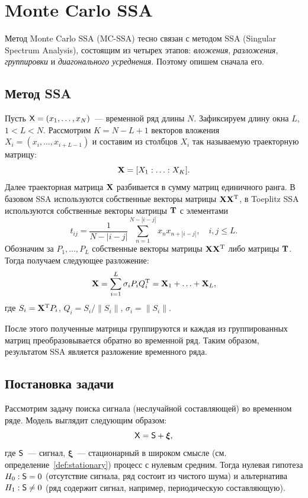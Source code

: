 \documentclass[specialist,
substylefile = spbu_report.rtx,
subf,12pt]{disser}
\theoremstyle{definition}
\begin{document}
\section{Monte Carlo SSA}\label{sect:mcssa}

Метод Monte Carlo SSA (MC-SSA) тесно связан с методом SSA (Singular Spectrum Analysis), состоящим из четырех этапов: \emph{вложения}, \emph{разложения}, \emph{группировки} и \emph{диагонального усреднения}. Поэтому опишем сначала его.
\subsection{Метод SSA}
Пусть $\mathsf{X}=(x_1,\ldots,x_N)$~--- временной ряд длины $N$. Зафиксируем длину окна $L$, $1<L<N$. Рассмотрим $K=N-L+1$ векторов вложения $X_i=(x_i,\ldots,x_{i+L-1})$ и составим из столбцов $X_i$ так называемую траекторную матрицу:
\[
	\mathbf{X} = [X_1:\ldots:X_K].
\]
Далее траекторная матрица $\mathbf{X}$ разбивается в сумму матриц единичного ранга. В базовом SSA используются собственные векторы матрицы $\mathbf{X}\mathbf{X}^{\mathrm{T}}$, в Toeplitz SSA используются собственные векторы матрицы $\mathbf{T}$ с элементами
\begin{equation}\label{eq:toeplitz}
	t_{ij} = \frac{1}{N - |i - j|}\sum_{n=1}^{N - |i - j|}x_n x_{n+|i-j|},\quad i,j\leqslant L.
\end{equation}
Обозначим за $P_1,\ldots,P_L$ собственные векторы матрицы $\mathbf{X}\mathbf{X}^{\mathrm{T}}$ либо матрицы $\mathbf{T}$. Тогда получаем следующее разложение:
\[
	\mathbf{X} = \sum_{i=1}^L \sigma_i P_i Q_i^{\mathrm{T}} = \mathbf{X}_1+\ldots+\mathbf{X}_L,
\]
где $S_i=\mathbf{X}^{\mathrm{T}} P_i$, $Q_i=S_i/\|S_i\|$, $\sigma_i=\|S_i\|$.

После этого полученные матрицы группируются и каждая из группированных матриц преобразовывается обратно во временной ряд. Таким образом, результатом SSA является разложение временного ряда.
\subsection{Постановка задачи}
Рассмотрим задачу поиска сигнала (неслучайной составляющей) во временном ряде. Модель выглядит следующим образом:
\[
	\mathsf{X}=\mathsf{S} + \bm\xi,
\]
где $\mathsf{S}$~--- сигнал, $\bm\xi$~--- стационарный в широком смысле (см. определение~\ref{def:stationary}) процесс с нулевым средним. Тогда нулевая гипотеза $H_0:\mathsf{S}=0$ (отсутствие сигнала, ряд состоит из чистого шума) и альтернатива $H_1:\mathsf{S}\ne0$ (ряд содержит сигнал, например, периодическую составляющую).
\end{document}
